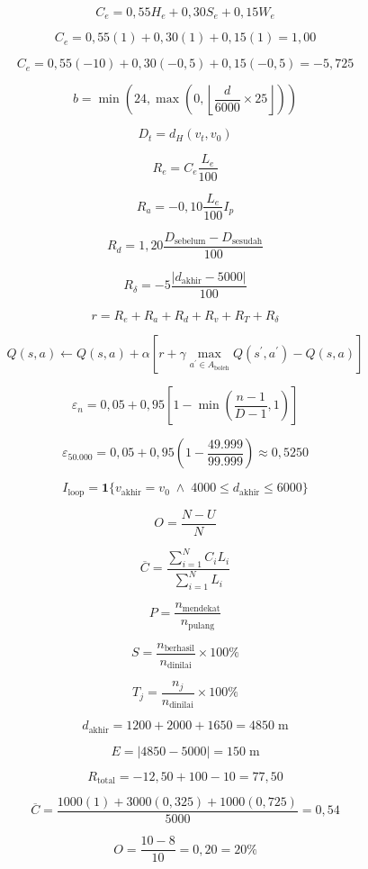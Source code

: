 \[
C_e=0{,}55H_e+0{,}30S_e+0{,}15W_e
\]

\[
C_e=0{,}55(1)+0{,}30(1)+0{,}15(1)=1{,}00
\]

\[
C_e=0{,}55(-10)+0{,}30(-0{,}5)+0{,}15(-0{,}5)=-5{,}725
\]

\[
b=\min\left(24,\max\left(0,\left\lfloor\frac{d}{6000}\times25\right\rfloor\right)\right)
\]

\[
D_t=d_H(v_t,v_0)
\]

\[
R_e=C_e\frac{L_e}{100}
\]

\[
R_a=-0{,}10\frac{L_e}{100}I_p
\]

\[
R_d=1{,}20\frac{D_{\mathrm{sebelum}}-D_{\mathrm{sesudah}}}{100}
\]

\[
R_\delta=-5\frac{|d_{\mathrm{akhir}}-5000|}{100}
\]

\[
r=R_e+R_a+R_d+R_v+R_T+R_\delta
\]

\[
Q(s,a)\leftarrow Q(s,a)+\alpha\left[r+\gamma\max_{a^\prime\in A_{\mathrm{boleh}}}Q(s^\prime,a^\prime)-Q(s,a)\right]
\]

\[
\varepsilon_n=0{,}05+0{,}95\left[1-\min\left(\frac{n-1}{D-1},1\right)\right]
\]

\[
\varepsilon_{50.000}=0{,}05+0{,}95\left(1-\frac{49.999}{99.999}\right)\approx0{,}5250
\]

\[
I_{\mathrm{loop}}=\mathbf{1}\{v_{\mathrm{akhir}}=v_0\;\land\;4000\le d_{\mathrm{akhir}}\le6000\}
\]

\[
O=\frac{N-U}{N}
\]

\[
\overline C=\frac{\sum_{i=1}^{N}C_iL_i}{\sum_{i=1}^{N}L_i}
\]

\[
P=\frac{n_{\mathrm{mendekat}}}{n_{\mathrm{pulang}}}
\]

\[
S=\frac{n_{\mathrm{berhasil}}}{n_{\mathrm{dinilai}}}\times100\%
\]

\[
T_j=\frac{n_j}{n_{\mathrm{dinilai}}}\times100\%
\]

\[
d_{\mathrm{akhir}}=1200+2000+1650=4850\;\mathrm{m}
\]

\[
E=|4850-5000|=150\;\mathrm{m}
\]

\[
R_{\mathrm{total}}=-12{,}50+100-10=77{,}50
\]

\[
\overline C=\frac{1000(1)+3000(0{,}325)+1000(0{,}725)}{5000}=0{,}54
\]

\[
O=\frac{10-8}{10}=0{,}20=20\%
\]
